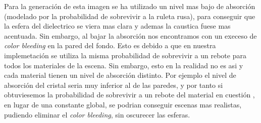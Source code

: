 \documentclass[10pt,oneside,a4paper]{article}
\begin{document}
Para la generación de esta imagen se ha utilizado un nivel mas bajo de absorción (modelado por la probabilidad de sobrevivir a la ruleta rusa), para conseguir que la esfera del dielectrico se viera mas clara y ademas la caustica fuese mas acentuada. Sin embargo, al bajar la absorción nos encontramos con un execeso de \textit{color bleeding} en la pared del fondo. Esto es debido a que en nuestra implemetación se utiliza la misma probabilidad de sobrevivir a un rebote para todos los materiales de la escena. Sin embargo, esto en la realidad no es asi y cada material tienen un nivel de absorción distinto. Por ejemplo el nivel de absorción del cristal seria muy inferior al de las paredes, y por tanto si obtuviesemos la probabilidad de sobrevivir a un rebote del material en cuestión , en lugar de una constante global, se podrian conseguir escenas mas realistas, pudiendo eliminar el \textit{color bleeding}, sin oscurecer las esferas.   
  
\end{document}
